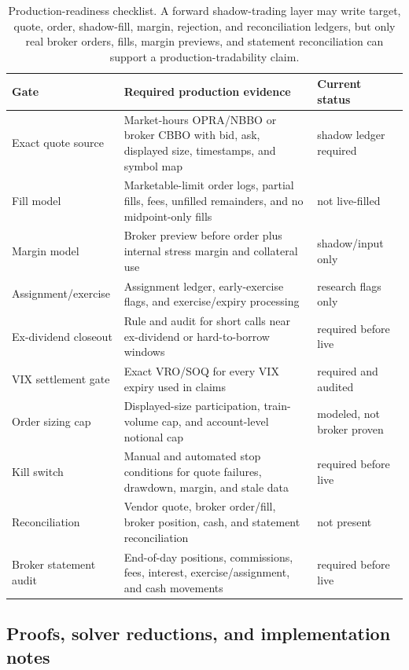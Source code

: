 \begin{table}[H]
\centering
\scriptsize
\begin{tabularx}{\textwidth}{L{1.55in}X L{1.3in}}
\toprule
Gate & Required production evidence & Current status \\
\midrule
Exact quote source & Market-hours OPRA/NBBO or broker CBBO with bid, ask, displayed size, timestamps, and symbol map & shadow ledger required \\
Fill model & Marketable-limit order logs, partial fills, fees, unfilled remainders, and no midpoint-only fills & not live-filled \\
Margin model & Broker preview before order plus internal stress margin and collateral use & shadow/input only \\
Assignment/exercise & Assignment ledger, early-exercise flags, and exercise/expiry processing & research flags only \\
Ex-dividend closeout & Rule and audit for short calls near ex-dividend or hard-to-borrow windows & required before live \\
VIX settlement gate & Exact VRO/SOQ for every VIX expiry used in claims & required and audited \\
Order sizing cap & Displayed-size participation, train-volume cap, and account-level notional cap & modeled, not broker proven \\
Kill switch & Manual and automated stop conditions for quote failures, drawdown, margin, and stale data & required before live \\
Reconciliation & Vendor quote, broker order/fill, broker position, cash, and statement reconciliation & not present \\
Broker statement audit & End-of-day positions, commissions, fees, interest, exercise/assignment, and cash movements & required before live \\
\bottomrule
\end{tabularx}
\caption{Production-readiness checklist. A forward shadow-trading layer may write target,
quote, order, shadow-fill, margin, rejection, and reconciliation ledgers, but only real
broker orders, fills, margin previews, and statement reconciliation can support a
production-tradability claim.}
\label{tab:production_readiness_checklist}
\end{table}

\subsection{Proofs, solver reductions, and implementation notes}\label{sec:appendix_proofs}

